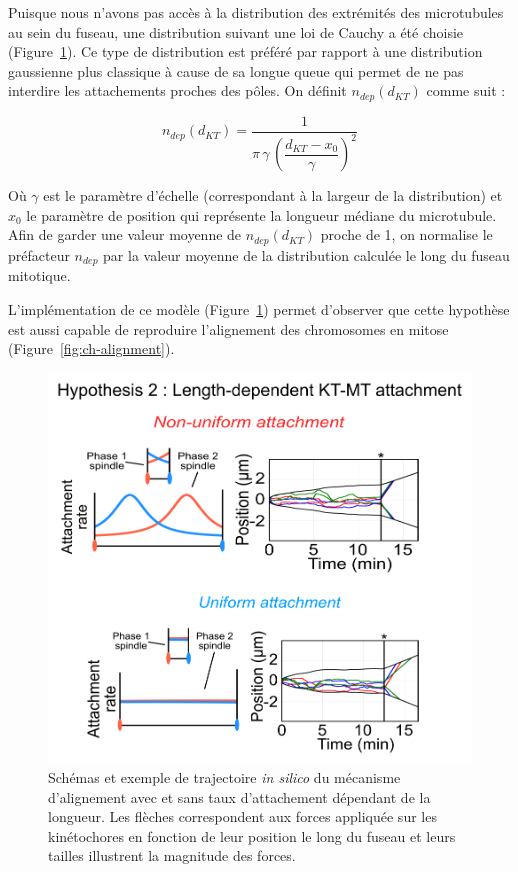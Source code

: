 \documentclass[12pt,a4paper,twoside,openright]{book}
\begin{document}
Puisque nous n'avons pas accès à la distribution des extrémités des
microtubules au sein du fuseau, une distribution suivant une loi de
Cauchy a été choisie (Figure~\ref{fig:hyp2}). Ce type de distribution
est préféré par rapport à une distribution gaussienne plus classique à
cause de sa longue queue qui permet de ne pas interdire les attachements
proches des pôles. On définit \(n_{dep}(d_{KT})\) comme suit :

\[
n_{dep}(d_{KT}) = \dfrac{1}{\pi \, \gamma \, (\dfrac{d_{KT} - x_0}{\gamma})^2}
\]

Où \(\gamma\) est le paramètre d'échelle (correspondant à la largeur de
la distribution) et \(x_0\) le paramètre de position qui représente la
longueur médiane du microtubule. Afin de garder une valeur moyenne de
\(n_{dep}(d_{KT})\) proche de 1, on normalise le préfacteur \(n_{dep}\)
par la valeur moyenne de la distribution calculée le long du fuseau
mitotique.

L'implémentation de ce modèle (Figure~\ref{fig:hyp2}) permet d'observer
que cette hypothèse est aussi capable de reproduire l'alignement des
chromosomes en mitose (Figure~\ref{fig:ch-alignment}).

\begin{figure}[htbp]
\centering
\includegraphics{figures/results/modelling/hyp2.png}
\caption[Second mécanisme expliquant l'alignement des chromosomes]{\label{fig:hyp2}Schémas
et exemple de trajectoire \emph{in silico} du mécanisme d'alignement
avec et sans taux d'attachement dépendant de la longueur. Les flèches
correspondent aux forces appliquée sur les kinétochores en fonction de
leur position le long du fuseau et leurs tailles illustrent la magnitude
des forces.}
\end{figure}
\end{document}
